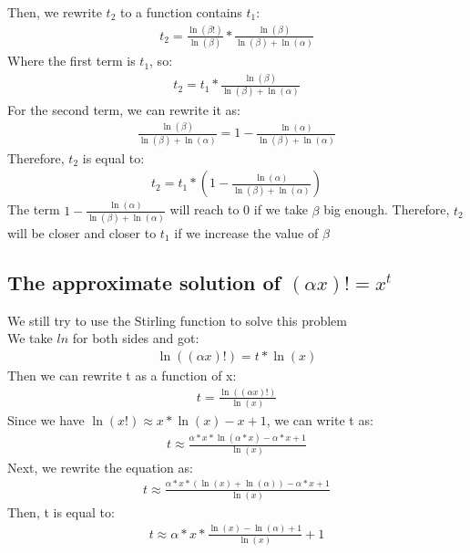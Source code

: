 \documentclass{article}
\begin{document}
        Then, we rewrite $t_2$ to a function contains $t_1$:
            \begin{align*}
                t_2 = \frac{\ln(\beta !)}{\ln(\beta)} * \frac{\ln(\beta)}{\ln(\beta) + \ln(\alpha)}
            \end{align*}
        Where the first term is $t_1$, so:
            \begin{align*}
                t_2 = t_1 * \frac{\ln(\beta)}{\ln(\beta) + \ln(\alpha)}
            \end{align*}
        For the second term, we can rewrite it as:
            \begin{align*}
                \frac{\ln(\beta)}{\ln(\beta) + \ln(\alpha)} = 1 - \frac{\ln(\alpha)}{\ln(\beta) + \ln(\alpha)}
            \end{align*}
        Therefore, $t_2$ is equal to:
            \begin{align*}
                t_2 = t_1 * (1 - \frac{\ln(\alpha)}{\ln(\beta) + \ln(\alpha)})
            \end{align*}
        The term $1 - \frac{\ln(\alpha)}{\ln(\beta) + \ln(\alpha)}$ will reach to 0 if we take $\beta$ big enough. Therefore, $t_2$ will be closer and closer to $t_1$ if we increase the value of $\beta$

        
        \subsection{The approximate solution of ${(\alpha x)}! = x ^ {t}$}
        We still try to use the Stirling function to solve this problem\\

        We take $ln$ for both sides and got:
            \begin{align*}
                \ln((\alpha x)!) = t * \ln(x)
            \end{align*}
        Then we can rewrite t as a function of x:
            \begin{align*}
                t = \frac{\ln((\alpha x)!)}{\ln(x)}
            \end{align*}
        Since we have $\ln(x!) \approx x * \ln(x) - x + 1$, we can write t as:
            \begin{align*}
                t \approx \frac{\alpha * x * \ln(\alpha * x) - \alpha * x + 1}{\ln(x)}
            \end{align*}
        Next, we rewrite the equation as:
            \begin{align*}
                t \approx \frac{\alpha * x * (\ln(x) + \ln(\alpha)) - \alpha * x + 1}{\ln(x)}
            \end{align*}
        Then, t is equal to:
            \begin{align*}
                t \approx \alpha * x * \frac{\ln(x) - \ln(\alpha) + 1}{\ln(x)} + 1
            \end{align*}
             
\end{document}
